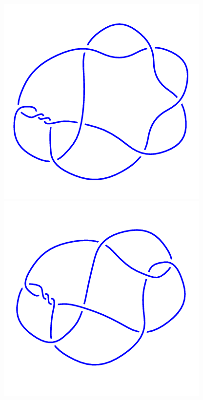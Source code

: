 \begin{figure}[H]
    \begin{minipage}[b]{.18\linewidth}
        \centering
        \includegraphics[width=\linewidth]{../data/10_17.png}
    \end{minipage}
    \begin{minipage}[b]{.18\linewidth}
        \centering
        \includegraphics[width=\linewidth]{../data/10_18.png}

\end{minipage}
\end{figure}

